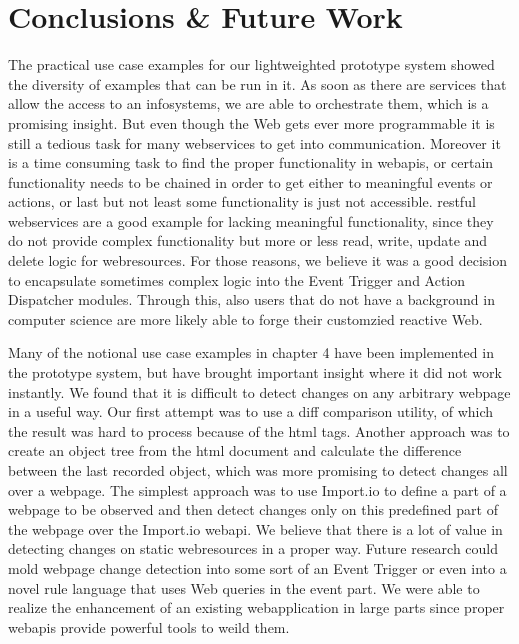 
\chapter{Conclusions \& Future Work}

The practical use case examples for our lightweighted prototype system showed the diversity of examples that can be run in it.
As soon as there are services that allow the access to an \textrm{\glspl{infosystem}}, we are able to orchestrate them, which is a promising insight.
But even though the Web gets ever more programmable it is still a tedious task for many \textrm{\glspl{webservice}} to get into communication.
Moreover it is a time consuming task to find the proper functionality in \textrm{\glspl{webapi}}, or certain functionality needs to be chained in order to get either to meaningful events or actions, or last but not least some functionality is just not accessible.
\textrm{\acrshort{rest}}ful \textrm{\glspl{webservice}} are a good example for lacking meaningful functionality, since they do not provide complex functionality but more or less read, write, update and delete logic for \textrm{\glspl{webresource}}.
For those reasons, we believe it was a good decision to encapsulate sometimes complex logic into the \textrm{Event Trigger} and \textrm{Action Dispatcher} modules.
Through this, also users that do not have a background in computer science are more likely able to forge their customzied reactive Web.

Many of the notional use case examples in chapter 4 have been implemented in the prototype system, but have brought important insight where it did not work instantly.
We found that it is difficult to detect changes on any arbitrary webpage in a useful way.
Our first attempt was to use a diff comparison utility, of which the result was hard to process because of the \textrm{\acrshort{html}} tags.
Another approach was to create an object tree from the \textrm{\acrshort{html}} document and calculate the difference between the last recorded object, which was more promising to detect changes all over a webpage.
The simplest approach was to use \textrm{Import.io} to define a part of a webpage to be observed and then detect changes only on this predefined part of the webpage over the \textrm{Import.io} \textrm{\gls{webapi}}.
We believe that there is a lot of value in detecting changes on static \textrm{\glspl{webresource}} in a proper way.
Future research could mold webpage change detection into some sort of an \textrm{Event Trigger} or even into a novel rule language that uses Web queries in the event part.
We were able to realize the enhancement of an existing \textrm{\gls{webapplication}} in large parts since proper \textrm{\glspl{webapi}} provide powerful tools to weild them.

